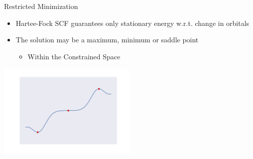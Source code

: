 \documentclass[10pt]{beamer}
\begin{document}
{{%


\begin{frame}[fragile]{Restricted Minimization}
	\begin{itemize}
		\item<1-> Hartee-Fock SCF guarantees only stationary energy w.r.t. change in orbitals
		\item<1-> The solution may be a maximum, minimum or saddle point
		\begin{itemize}
			\item<2->[] \begin{alertblock}{Within the Constrained Space} \end{alertblock}
		\end{itemize}
	\end{itemize}
	\begin{center}
		\includegraphics[width=0.5\textwidth, trim={3cm, 2cm, 3cm, 2cm}, clip]{../images/1d_extrema.pdf}
	\end{center}
\end{frame}

}}
\end{document}
